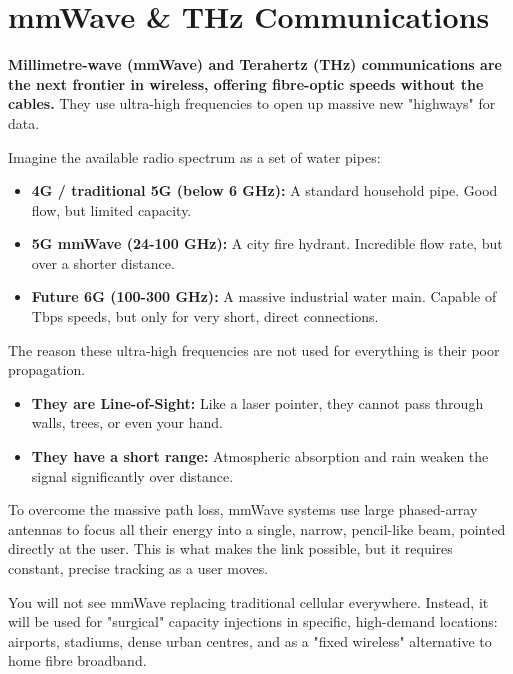 
\chapter{mmWave \& THz Communications}
\label{ch:mmwave-thz}

\begin{nontechnical}
    \textbf{Millimetre-wave (mmWave) and Terahertz (THz) communications are the next frontier in wireless, offering fibre-optic speeds without the cables.} They use ultra-high frequencies to open up massive new "highways" for data.

    Imagine the available radio spectrum as a set of water pipes:
    \begin{itemize}
        \item \textbf{4G / traditional 5G (below 6 GHz):} A standard household pipe. Good flow, but limited capacity.
        \item \textbf{5G mmWave (24-100 GHz):} A city fire hydrant. Incredible flow rate, but over a shorter distance.
        \item \textbf{Future 6G (100-300 GHz):} A massive industrial water main. Capable of Tbps speeds, but only for very short, direct connections.
    \end{itemize}

    The reason these ultra-high frequencies are not used for everything is their poor propagation.
    \begin{itemize}
        \item \textbf{They are Line-of-Sight:} Like a laser pointer, they cannot pass through walls, trees, or even your hand.
        \item \textbf{They have a short range:} Atmospheric absorption and rain weaken the signal significantly over distance.
    \end{itemize}

    To overcome the massive path loss, mmWave systems use large phased-array antennas to focus all their energy into a single, narrow, pencil-like beam, pointed directly at the user. This  is what makes the link possible, but it requires constant, precise tracking as a user moves.

    You will not see mmWave replacing traditional cellular everywhere. Instead, it will be used for "surgical" capacity injections in specific, high-demand locations: airports, stadiums, dense urban centres, and as a "fixed wireless" alternative to home fibre broadband.
\end{nontechnical}


